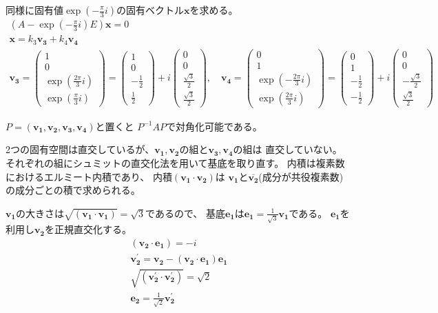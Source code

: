 \documentclass[10pt,b5paper]{ltjsarticle}
\begin{document}
同様に固有値$\exp{(-\frac{\pi}{3}i)}$の固有ベクトル$\bm{x}$を求める。
\begin{gather}
 \left( A-\exp{(-\frac{\pi}{3}i)} E \right)\bm{x} =0\\
 \bm{x}= k_3 \bm{v_3} + k_4 \bm{v_4}\\
 \bm{v_3}=
 \begin{pmatrix}
  1\\0\\\exp{(\frac{2\pi}{3}i)}\\\exp{(\frac{\pi}{3}i)}
 \end{pmatrix}
 =
 \begin{pmatrix}
  1\\0\\-\frac{1}{2}\\\frac{1}{2}
 \end{pmatrix}
 +i
 \begin{pmatrix}
  0\\0\\\frac{\sqrt{3}}{2}\\\frac{\sqrt{3}}{2}
 \end{pmatrix}
 , \quad
 \bm{v_4}=
 \begin{pmatrix}
  0\\1\\\exp{(-\frac{2\pi}{3}i)}\\\exp{(\frac{2\pi}{3}i)}
 \end{pmatrix}
 =
 \begin{pmatrix}
  0\\1\\-\frac{1}{2}\\-\frac{1}{2}
 \end{pmatrix}
 +i
 \begin{pmatrix}
  0\\0\\-\frac{\sqrt{3}}{2}\\\frac{\sqrt{3}}{2}
 \end{pmatrix}
\end{gather}


$P=(\bm{v_1}, \bm{v_2}, \bm{v_3}, \bm{v_4})$と置くと
$P^{-1}AP$で対角化可能である。

2つの固有空間は直交しているが、$\bm{v_1}, \bm{v_2}$の組と$\bm{v_3}, \bm{v_4}$の組は
直交していない。
それぞれの組にシュミットの直交化法を用いて基底を取り直す。
内積は複素数におけるエルミート内積であり、
内積$(\bm{v_1}\cdot \bm{v_2})$は
$\bm{v_1}$と$\overline{\bm{v_2}}$(成分が共役複素数)の成分ごとの積で求められる。

$\bm{v_1}$の大きさは$\sqrt{(\bm{v_1}\cdot \bm{v_1})}=\sqrt{3}$であるので、
基底$\bm{e_1}$は$\bm{e_1}=\frac{1}{\sqrt{3}}\bm{v_1}$である。
$\bm{e_1}$を利用し$\bm{v_2}$を正規直交化する。
\begin{gather}
 (\bm{v_2}\cdot \bm{e_1})=-i\\
 \bm{v_2^\prime} = \bm{v_2} - (\bm{v_2}\cdot \bm{e_1})\bm{e_1}\\
 \sqrt{(\bm{v_2^\prime} \cdot \bm{v_2^\prime})}=\sqrt{2}\\
 \bm{e_2}=\frac{1}{\sqrt{2}}\bm{v_2^\prime}
\end{gather}
\end{document}
